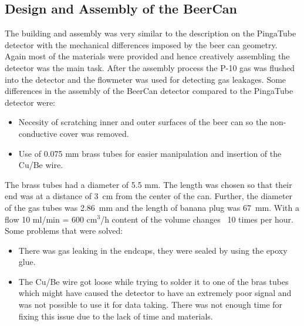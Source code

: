\subsection{Design and Assembly of the BeerCan}
\label{sec:design_and_assembly_beercan}
The building and assembly was very similar to the description on the PingaTube
detector with the mechanical differences imposed by the beer can geometry.
Again most of the materials were provided and hence creatively assembling the
detector was the main task. After the assembly process the P-10 gas was flushed
into the detector and the flowmeter was used for detecting gas leakages.  Some
differences in the assembly of the BeerCan detector compared to the PingaTube
detector were:
\begin{itemize}
\item Necesity of scratching inner and outer surfaces of the beer can so the
  non-conductive cover was removed.
\item Use of 0.075 mm brass tubes for easier manipulation and insertion of the
  Cu/Be wire.
\end{itemize}
The brass tubes had a diameter of 5.5 mm. The length was chosen so that their
end was at a distance of 3~cm from the center of the can. Further, the diameter
of the gas tubes was 2.86~mm and the length of banana plug was 67~mm.
With a flow 10 ml/min = 600 cm$^3$/h content of the volume changes ~10 times per
hour.
Some problems that were solved:
\begin{itemize}
\item There was gas leaking in the endcaps, they were sealed by using the epoxy
  glue.
\item The Cu/Be wire got loose while trying to solder it to one of the bras
  tubes which might have caused the detector to have an extremely poor signal
  and was not possible to use it for data taking. There was not enough time for fixing this
  issue due to the lack of time and materials.
\end{itemize}
